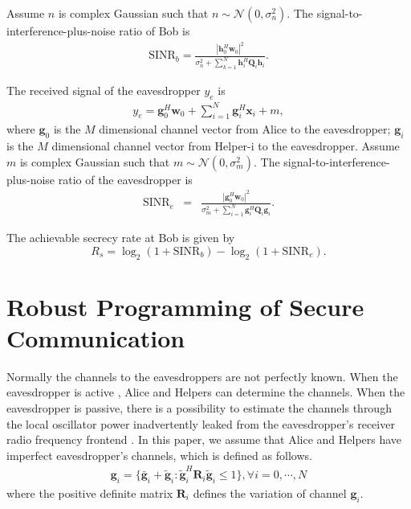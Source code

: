 \documentclass[conference]{IEEEtran}
\begin{document}
Assume $n$ is complex Gaussian such that $n \sim \mathcal{N}(0,\sigma_n^2)$. The signal-to-interference-plus-noise ratio of Bob is
\begin{eqnarray}
\mathrm{SINR}_b = \frac{\left| \mathbf{h}_{0}^H\mathbf{w}_{0}\right|^2}{\sigma_n^2 + \sum_{k=1}^{N}\mathbf{h}_{i}^H\mathbf{Q}_{i}\mathbf{h}_i}.
\end{eqnarray}

The received signal of the eavesdropper $y_e$ is
\begin{eqnarray}
y_e = \mathbf{g}_0^H\mathbf{w}_0 + \sum_{i = 1}^N\mathbf{g}_i^H\mathbf{x}_i + m,
\end{eqnarray}
where $\mathbf{g}_0$ is the $M$ dimensional channel vector from Alice to the eavesdropper; $\mathbf{g}_i$ is the $M$ dimensional channel vector from Helper-i to the eavesdropper.   Assume $m$ is complex Gaussian such that $m \sim \mathcal{N}(0,\sigma_m^2)$.
The signal-to-interference-plus-noise ratio of the eavesdropper is
\begin{eqnarray}
\mathrm{SINR}_e &=& \frac{\left| \mathbf{g}_{0}^H\mathbf{w}_{0}\right|^2}{\sigma_m^2 + \sum_{i=1}^{N}\mathbf{g}_{i}^H\mathbf{Q}_{i}\mathbf{g}_i} \label{eq:secure_capacity}.
\end{eqnarray}

The achievable secrecy rate at Bob is given by \cite{6728676}
\begin{equation}
R_s = \log_2\left(1 + \mathrm{SINR}_b\right)-\log_2\left(1 + \mathrm{SINR}_e\right).
\end{equation}


\section{Robust Programming of Secure Communication} \label{sec:robust programming}
Normally the channels to the eavesdroppers are not perfectly known. When the eavesdropper is active \cite{gopala2008secrecy,7015632}, Alice and Helpers can determine the channels. When the eavesdropper is passive, there is a possibility to estimate the channels through the local oscillator power inadvertently leaked from the eavesdropper's receiver radio frequency frontend \cite{mukherjee2012detecting,7015632}. In this paper,  we assume that  Alice and Helpers have imperfect eavesdropper's channels, which is defined as follows. 
\begin{eqnarray}
\mathbf{g}_i = \{\bar{\mathbf{g}}_i + \tilde{\mathbf{g}}_i: \tilde{\mathbf{g}}_i^H \mathbf{R}_i\tilde{\mathbf{g}}_i \leq 1\},\forall i = 0,\cdots, N
\end{eqnarray}
where the positive definite  matrix $\mathbf{R}_i $ defines the variation of channel $\mathbf{g}_i$. 
\end{document}
